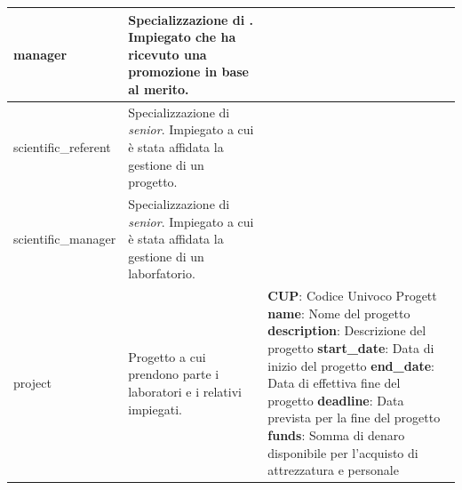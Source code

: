 \begin{longtable}{@{}| p{} | p{} | p{} |}
	\hline
	manager              & \begin{minipage}[t]{0.4\textwidth}
		                       \raggedright
		                       Specializzazione di \textit{\baseemp}. Impiegato che ha ricevuto una promozione in base al merito.
	                       \end{minipage}
	                     &                                                                                                                    \\[25pt]
	\hline
	scientific\_referent & \begin{minipage}[t]{0.4\textwidth}
		                       \raggedright
		                       Specializzazione di \textit{senior}. Impiegato a cui è stata affidata la gestione di un progetto.
	                       \end{minipage}
	                     &                                                                                                                    \\[25pt]
	\hline
	scientific\_manager  & \begin{minipage}[t]{0.4\textwidth}
		                       \raggedright
		                       Specializzazione di \textit{senior}.  Impiegato a cui è stata affidata la gestione di un laborfatorio.
	                       \end{minipage}
	                     &                                                                                                                    \\[25pt]
	\hline
	project              & \begin{minipage}[t]{0.4\textwidth}
		                       \raggedright
		                       Progetto a cui prendono parte i laboratori e i relativi impiegati.
	                       \end{minipage}
	                     & \begin{minipage}[t]{0.3\textwidth}
		                       \raggedright
		                       \textbf{CUP}: Codice Univoco Progett\sskip
		                       \textbf{name}: Nome del progetto\sskip
		                       \textbf{description}: Descrizione del progetto\sskip
		                       \textbf{start\_date}: Data di inizio del progetto\sskip
		                       \textbf{end\_date}: Data di effettiva fine del progetto\sskip
		                       \textbf{deadline}: Data prevista per la fine del progetto\sskip
		                       \textbf{funds}: Somma di denaro disponibile per l'acquisto di attrezzatura e personale

\end{minipage}
\end{longtable}
